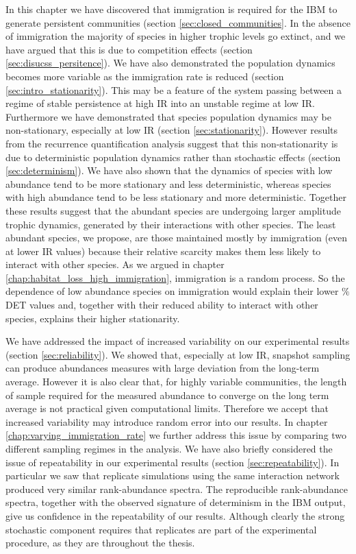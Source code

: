 In this chapter we have discovered that immigration is required for the IBM to generate persistent communities (section \ref{sec:closed_communities}. In the absence of immigration the majority of species in higher trophic levels go extinct, and we have argued that this is due to competition effects (section \ref{sec:disucss_persitence}). We have also demonstrated the population dynamics becomes more variable as the immigration rate is reduced (section \ref{sec:intro_stationarity}). This may be a feature of the system passing between a regime of stable persistence at high IR into an unstable regime at low IR. Furthermore we have demonstrated that species population dynamics may be non-stationary, especially at low IR (section \ref{sec:stationarity}). However results from the recurrence quantification analysis suggest that this non-stationarity is due to deterministic population dynamics rather than stochastic effects (section \ref{sec:determinism}). We have also shown that the dynamics of species with low abundance tend to be more stationary and less deterministic, whereas species with high abundance tend to be less stationary and more deterministic. Together these results suggest that the abundant species are undergoing larger amplitude trophic dynamics, generated by their interactions with other species. The least abundant species, we propose, are those maintained mostly by immigration (even at lower IR values) because their relative scarcity makes them less likely to interact with other species. As we argued in chapter \ref{chap:habitat_loss_high_immigration}, immigration is a random process. So the dependence of low abundance species on immigration would explain their lower $\%$DET values and, together with their reduced ability to interact with other species, explains their higher stationarity.

We have addressed the impact of increased variability on our experimental results (section \ref{sec:reliability}). We showed that, especially at low IR, snapshot sampling can produce abundances measures with large deviation from the long-term average. However it is also clear that, for highly variable communities, the length of sample required for the measured abundance to converge on the long term average is not practical given computational limits. Therefore we accept that increased variability may introduce random error into our results. In chapter \ref{chap:varying_immigration_rate} we further address this issue by comparing two different sampling regimes in the analysis. We have also briefly considered the issue of repeatability in our experimental results (section \ref{sec:repeatability}). In particular we saw that replicate simulations using the same interaction network produced very similar rank-abundance spectra. The reproducible rank-abundance spectra, together with the observed signature of determinism in the IBM output, give us confidence in the repeatability of our results. Although clearly the strong stochastic component requires that replicates are part of the experimental procedure, as they are throughout the thesis.   

